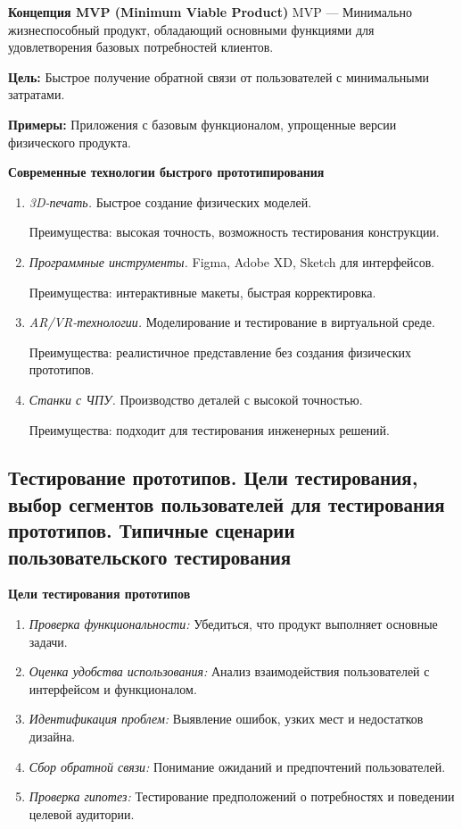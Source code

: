 \textbf{Концепция MVP (Minimum Viable Product)}
MVP --- Минимально жизнеспособный продукт, обладающий основными функциями для удовлетворения базовых потребностей клиентов.

\textbf{Цель:} Быстрое получение обратной связи от пользователей с минимальными затратами.

\textbf{Примеры:} Приложения с базовым функционалом, упрощенные версии физического продукта.

\textbf{Современные технологии быстрого прототипирования}

\begin{enumerate}
    \item \textit{3D-печать.} Быстрое создание физических моделей.

        Преимущества: высокая точность, возможность тестирования конструкции.
    \item \textit{Программные инструменты.} Figma, Adobe XD, Sketch для интерфейсов.

        Преимущества: интерактивные макеты, быстрая корректировка.
    \item \textit{AR/VR-технологии.} Моделирование и тестирование в виртуальной среде.

        Преимущества: реалистичное представление без создания физических прототипов.    
    \item \textit{Станки с ЧПУ.} Производство деталей с высокой точностью.

        Преимущества: подходит для тестирования инженерных решений.
    
\end{enumerate}

\pagebreak

\subsection{Тестирование прототипов. Цели тестирования, выбор сегментов пользователей для тестирования прототипов. Типичные сценарии пользовательского тестирования}

\textbf{Цели тестирования прототипов}

\begin{enumerate}
    \item \textit{Проверка функциональности:} Убедиться, что продукт выполняет основные задачи.
    \item \textit{Оценка удобства использования:} Анализ взаимодействия пользователей с интерфейсом и функционалом.
    \item \textit{Идентификация проблем:} Выявление ошибок, узких мест и недостатков дизайна.
    \item \textit{Сбор обратной связи:} Понимание ожиданий и предпочтений пользователей.
    \item \textit{Проверка гипотез:} Тестирование предположений о потребностях и поведении целевой аудитории.
\end{enumerate}


